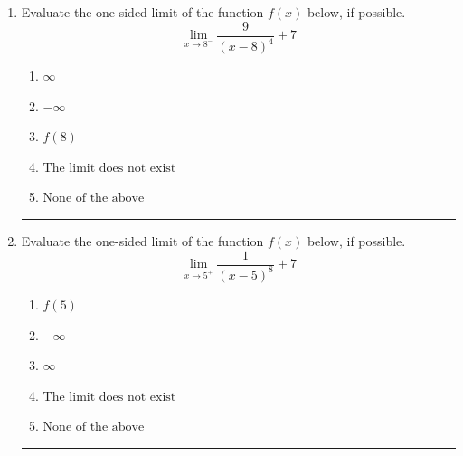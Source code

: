 \documentclass[14pt]{extbook}
\newcommand{\litem}[1]{\item#1\hspace*{-1cm}\rule{\textwidth}{0.4pt}}
\begin{document}
\begin{enumerate}
{\begin{enumerate}[label=\Alph*.]
\end{enumerate} }
\litem{
Evaluate the one-sided limit of the function $f(x)$ below, if possible.\[ \lim_{x \rightarrow 8^-} \frac{9}{(x-8)^4}+7 \]\begin{enumerate}[label=\Alph*.]
\item \( \infty \)
\item \( -\infty \)
\item \( f(8) \)
\item \( \text{The limit does not exist} \)
\item \( \text{None of the above} \)

\end{enumerate} }
\litem{
Evaluate the one-sided limit of the function $f(x)$ below, if possible.\[ \lim_{x \rightarrow 5^+} \frac{1}{(x-5)^8}+7 \]\begin{enumerate}[label=\Alph*.]
\item \( f(5) \)
\item \( -\infty \)
\item \( \infty \)
\item \( \text{The limit does not exist} \)
\item \( \text{None of the above} \)

\end{enumerate} }
\end{enumerate}
\end{document}
